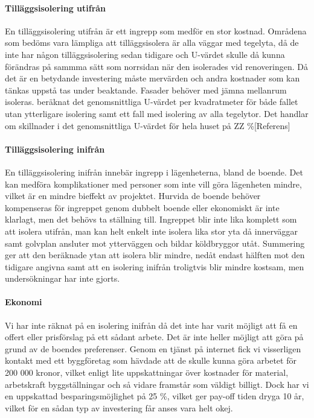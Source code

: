 \paragraph{Tilläggsisolering utifrån}
En tilläggsisolering utifrån är ett ingrepp som medför en stor kostnad. Områdena som bedöms vara lämpliga att tilläggsisolera är alla väggar med tegelyta, då de inte har någon tilläggsisolering sedan tidigare och U-värdet skulle då kunna förändras på sammma sätt som norrsidan när den isolerades vid renoveringen. Då det är en betydande investering måste mervärden och andra kostnader som kan tänkas uppstå tas under beaktande. Fasader behöver med jämna mellanrum isoleras. beräknat det genomsnittliga U-värdet per kvadratmeter för både fallet utan ytterligare isolering samt ett fall med isolering av alla tegelytor. Det handlar om skillnader i det genomsnittliga U-värdet för hela huset på ZZ \%[Referens]

\paragraph{Tilläggsisolering inifrån}
En tilläggsisolering inifrån innebär ingrepp i lägenheterna, bland de boende. Det kan medföra komplikationer med personer som inte vill göra lägenheten mindre, vilket är en mindre bieffekt av projektet. Hurvida de boende behöver kompenseras för ingreppet genom dubbelt boende eller ekonomiskt är inte klarlagt, men det behövs ta ställning till. Ingreppet blir inte lika komplett som att isolera utifrån, man kan helt enkelt inte isolera lika stor yta då innerväggar samt golvplan ansluter mot ytterväggen och bildar köldbryggor utåt. Summering ger att den beräknade ytan att isolera blir mindre, nedåt endast hälften mot den tidigare angivna samt att en isolering inifrån troligtvis blir mindre kostsam, men undersökningar har inte gjorts.

\paragraph{Ekonomi}
Vi har inte räknat på en isolering inifrån då det inte har varit möjligt att få en offert eller prisförslag på ett sådant arbete. Det är inte heller möjligt att göra på grund av de boendes preferenser. Genom en tjänst på internet fick vi visserligen kontakt med ett byggföretag som hävdade att de skulle kunna göra arbetet för 200 000 kronor, vilket enligt lite uppskattningar över kostnader för material, arbetskraft byggställningar och så vidare framstår som väldigt billigt. Dock har vi en uppskattad besparingsmöjlighet på 25 \%, vilket ger pay-off tiden dryga 10 år, vilket för en sådan typ av investering får anses vara helt okej.

